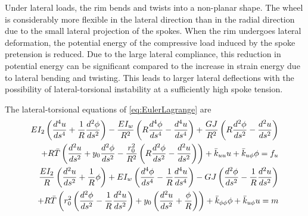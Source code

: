\documentclass[\rootdir/thesis.tex]{subfiles}
\begin{document}
Under lateral loads, the rim bends and twists into a non-planar shape. The wheel is considerably more flexible in the lateral direction than in the radial direction due to the small lateral projection of the spokes. When the rim undergoes lateral deformation, the potential energy of the compressive load induced by the spoke pretension is reduced. Due to the large lateral compliance, this reduction in potential energy can be significant compared to the increase in strain energy due to lateral bending and twisting. This leads to larger lateral deflections with the possibility of lateral-torsional instability at a sufficiently high spoke tension.

The lateral-torsional equations of \eqref{eq:EulerLagrange} are
\begin{subequations}
\label{eq:lat_ode_2}
\begin{align}
\begin{split}
  EI_2\left( \frac{d^4u}{ds^4} + \frac{1}{R}\frac{d^2\phi}{ds^2} \right)
  - \frac{EI_w}{R^2}\left( R\frac{d^4\phi}{ds^4} - \frac{d^4u}{ds^4} \right)
  + \frac{GJ}{R^2}\left( R\frac{d^2\phi}{ds^2} - \frac{d^2u}{ds^2} \right)\\
  + R\bar{T}\left( \frac{d^2u}{ds^2} + y_0\frac{d^2\phi}{ds^2}
                  -\frac{r_0^2}{R^2}\left(R\frac{d^2\phi}{ds^2}
                                          -\frac{d^2u}{ds^2}\right) \right)
  + \bar{k}_{uu} u + \bar{k}_{u\phi} \phi = f_u
\end{split}\\
\begin{split}
  \frac{EI_2}{R}\left( \frac{d^2u}{ds^2} + \frac{1}{R}\phi \right)
  + EI_w\left( \frac{d^4\phi}{ds^4} - \frac{1}{R}\frac{d^4u}{ds^4} \right)
  - GJ\left( \frac{d^2\phi}{ds^2} - \frac{1}{R}\frac{d^2u}{ds^2} \right)\\
  + R\bar{T}\left(r_0^2\left(\frac{d^2\phi}{ds^2} - \frac{1}{R}\frac{d^2u}{ds^2}\right)
                  +y_0\left( \frac{d^2u}{ds^2} + \frac{\phi}{R} \right)\right)
  + \bar{k}_{\phi\phi} \phi + \bar{k}_{u\phi} u = m
\end{split}
\end{align}
\end{subequations}
\end{document}
